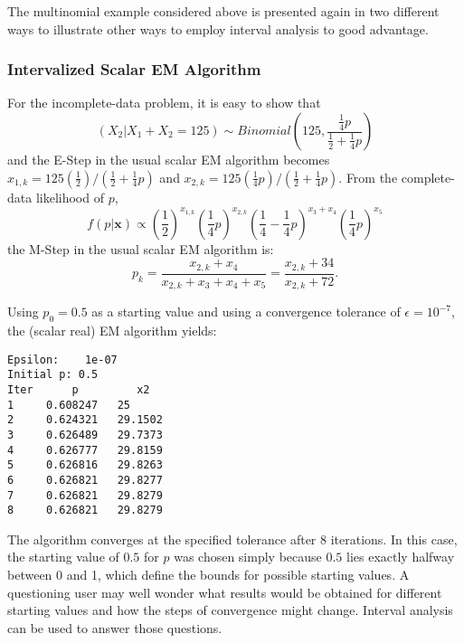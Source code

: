 The multinomial example considered above is presented again in two
different ways to illustrate other ways to employ interval
analysis to good advantage.

\subsubsection{Intervalized Scalar EM Algorithm}

For the incomplete-data problem, it is easy to show that 
$$(X_2 | X_1 + X_2 = 125) \sim
   Binomial \left(125, \frac{\frac{1}{4}p}{\frac{1}{2}+\frac{1}{4}p}\right)$$ 
and the E-Step in the usual scalar EM algorithm becomes
 $x_{1,k} = 125( \frac{1}{2}) / (\frac{1}{2}+\frac{1}{4}p)$ and
 $x_{2,k} = 125( \frac{1}{4}p) /(\frac{1}{2}+\frac{1}{4}p)$. 
From the complete-data likelihood of $p$,
$$ f(p|\mathbf{x}) \propto 
   \left(\frac{1}{2}\right)^{x_{1,k}} \left(\frac{1}{4}p\right)^{x_{2,k}} 
   \left(\frac{1}{4}- \frac{1}{4} p\right)^{x_3 + x_4} 
   \left(\frac{1}{4} p\right)^{x_5} $$
the M-Step in the usual scalar EM algorithm is:
$$
p_k = \frac{x_{2,k} + x_4}{x_{2,k} + x_3 + x_4 + x_5}
         =  \frac{x_{2,k} + 34}{x_{2,k} + 72} .
$$
 
Using $p_0 = 0.5$ as a starting value and using a convergence tolerance of 
$\epsilon = 10^{-7}$, the (scalar real) EM algorithm yields:
\begin{verbatim}
Epsilon:    1e-07
Initial p: 0.5
Iter      p         x2       
1     0.608247   25
2     0.624321   29.1502
3     0.626489   29.7373
4     0.626777   29.8159
5     0.626816   29.8263
6     0.626821   29.8277
7     0.626821   29.8279
8     0.626821   29.8279
\end{verbatim}
The algorithm converges at the specified tolerance after 8 iterations.  In
this case, the starting value of $0.5$ for $p$ was chosen simply because $0.5$
lies exactly halfway between 0 and 1, which define the bounds for possible
starting values.  A questioning user may well wonder what results would be
obtained for different starting values and how the steps of convergence might
change.  Interval analysis can be used to answer those questions. 

